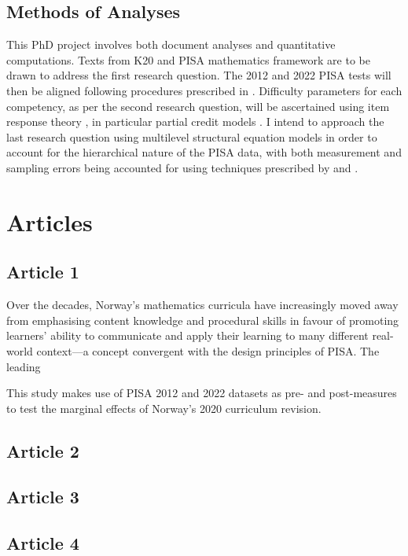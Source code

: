 \documentclass[
    a4paper,                %
    11pt,                   %
    stu,                    %
    donotrepeattitle,       %
    floatsintext,           %
    biblatex,               %
    colorlinks=true,        %
    linkcolor=red,          %
    anchorcolor=black,      %
    citecolor=blue,         %
    urlcolor=blue,          %
    bookmarks=true,         %
    bookmarksopen=false,    %
    bookmarksnumbered=true, %
    dvipsnames              %
]{apa7}
\begin{document}
\subsection{Methods of Analyses}

This PhD project involves both document analyses and quantitative computations. Texts from K20 \parencite{udir:2020} and PISA mathematics framework \parencite{oecd:2013,oecd:2018} are to be drawn to address the first research question. The 2012 and 2022 PISA tests will then be aligned following procedures prescribed in \textcite{kolen:2014}. Difficulty parameters for each competency, as per the second research question, will be ascertained using item response theory \parencite{deayala:2022}, in particular partial credit models \parencite{masters:1982}. I intend to approach the last research question using multilevel structural equation models in order to account for the hierarchical nature of the PISA data, with both measurement and sampling errors being accounted for using techniques prescribed by \textcite{ludtke:2008} and \textcite{marsh:2009}.

\section{Articles}

\subsection{Article 1}

Over the decades, Norway's mathematics curricula have increasingly moved away from emphasising content knowledge and procedural skills in favour of promoting learners' ability to communicate and apply their learning to many different real-world context---a concept convergent with the design principles of PISA. The leading

This study makes use of PISA 2012 and 2022 datasets as pre- and post-measures to test the marginal effects of Norway's 2020 curriculum revision.

\subsection{Article 2}

\subsection{Article 3}

\subsection{Article 4}
\end{document}
